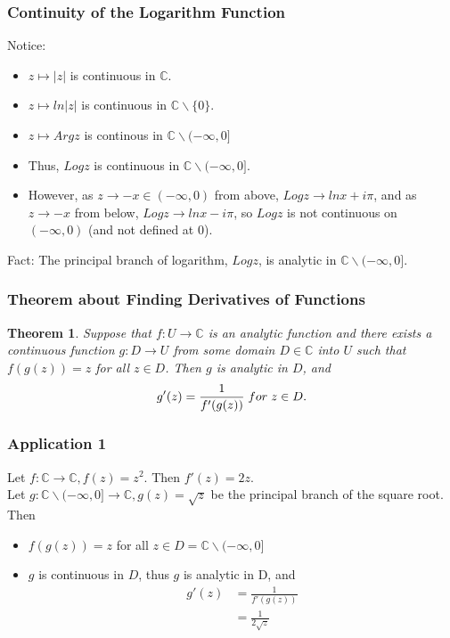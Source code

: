 \documentclass{article}
\newtheorem{theorem}{Theorem}[section]
\begin{document}
\subsubsection{Continuity of the Logarithm Function}
Notice:
\begin{itemize}
\item $z \mapsto \left|z\right|$ is continuous in $\mathbb{C}$.
\item $z \mapsto ln\left|z\right|$ is continuous in $\mathbb{C} \backslash \{0\}$.
\item $z \mapsto Arg z$ is continous in $\mathbb{C} \backslash (-\infty, 0]$
\item Thus, $Log z$ is continuous in $\mathbb{C} \backslash (-\infty, 0]$.
\item However, as $z \to -x \in (-\infty, 0)$ from above, $Log z \to ln x + i\pi$, and as $z \to -x$ from below, $Log z \to ln x - i\pi$, so $Log z$ is not continuous on $(-\infty, 0)$ (and not defined at 0).
\end{itemize}
Fact: The principal branch of logarithm, $Log z$, is analytic in $\mathbb{C} \backslash (-\infty, 0]$.

\subsubsection{Theorem about Finding Derivatives of Functions}
\begin{theorem}
Suppose that $f : U \to \mathbb{C}$ is an analytic function and there exists a continuous function $g : D \to U$ from some domain $D \in \mathbb{C}$ into $U$ such that $f(g(z)) = z$ for all $z \in D$. Then $g$ is analytic in $D$, and
\begin{equation*}
g'(z) = \frac{1}{f'(g(z))} \hspace{0.1cm} for \hspace{0.1cm} z \in D.
\end{equation*}
\end{theorem}
\subsubsection{Application 1}
Let $f : \mathbb{C} \to \mathbb{C}, f(z) = z^2.$ Then $f'(z) = 2z$. \\
Let $g : \mathbb{C} \backslash (-\infty, 0] \to \mathbb{C}, g(z) = \sqrt{z}$ be the principal branch of the square root. \\
Then
\begin{itemize}
\item $f(g(z)) = z$ for all $z \in D = \mathbb{C} \backslash (-\infty, 0]$
\item $g$ is continuous in $D$, thus $g$ is analytic in D, and
\begin{align*}
g'(z) &= \frac{1}{f'(g(z))} \\
&= \frac{1}{2\sqrt{z}}
\end{align*}
\end{itemize}
\end{document}

